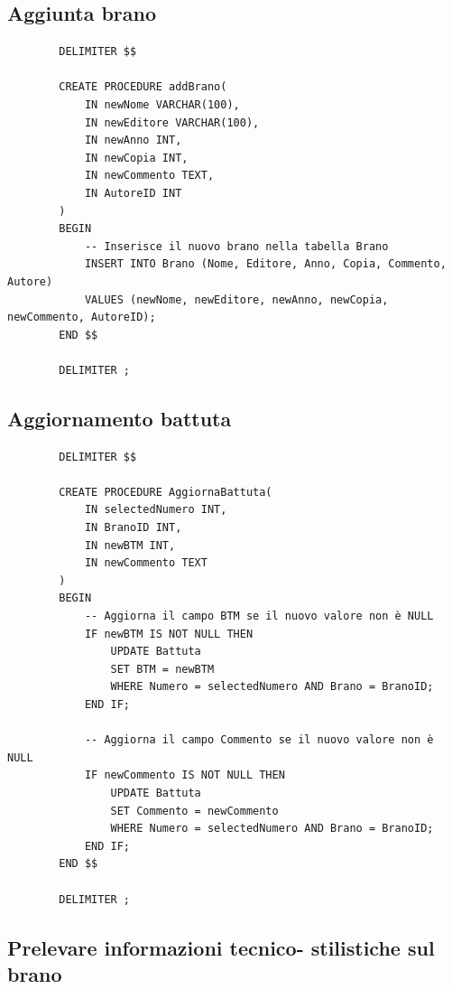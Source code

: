 \documentclass{article}
\begin{document}
    \subsection{Aggiunta brano}
    
    \begin{verbatim}
        DELIMITER $$

        CREATE PROCEDURE addBrano(
            IN newNome VARCHAR(100),
            IN newEditore VARCHAR(100),
            IN newAnno INT,
            IN newCopia INT,
            IN newCommento TEXT,
            IN AutoreID INT
        )
        BEGIN
            -- Inserisce il nuovo brano nella tabella Brano
            INSERT INTO Brano (Nome, Editore, Anno, Copia, Commento, Autore)
            VALUES (newNome, newEditore, newAnno, newCopia, newCommento, AutoreID);
        END $$

        DELIMITER ;
    \end{verbatim}
    
    \subsection{Aggiornamento battuta}
    
    \begin{verbatim}
        DELIMITER $$

        CREATE PROCEDURE AggiornaBattuta(
            IN selectedNumero INT,
            IN BranoID INT,
            IN newBTM INT,
            IN newCommento TEXT
        )
        BEGIN
            -- Aggiorna il campo BTM se il nuovo valore non è NULL
            IF newBTM IS NOT NULL THEN
                UPDATE Battuta
                SET BTM = newBTM
                WHERE Numero = selectedNumero AND Brano = BranoID;
            END IF;

            -- Aggiorna il campo Commento se il nuovo valore non è NULL
            IF newCommento IS NOT NULL THEN
                UPDATE Battuta
                SET Commento = newCommento
                WHERE Numero = selectedNumero AND Brano = BranoID;
            END IF;
        END $$

        DELIMITER ;
    \end{verbatim}
    
    \subsection{Prelevare informazioni tecnico-
    stilistiche sul brano}
    
\end{document}
